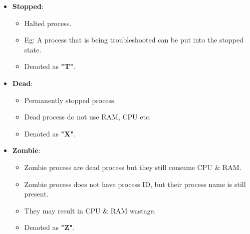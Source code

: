 \begin{flushleft}
\begin{itemize}
		\bigskip
		\item \textbf{Stopped}: 
		\begin{itemize}
			\item Halted process.
			\item Eg: A process that is being troubleshooted can be put into the stopped state.
			\item Denoted as \textbf{"T"}.
		\end{itemize}
		
		\bigskip
		\item \textbf{Dead}:
		\begin{itemize}
			\item Permanently stopped process.
			\item Dead process do not use RAM, CPU etc.
			\item Denoted as \textbf{"X"}.
		\end{itemize}
		
		
		\bigskip
		\item \textbf{Zombie}: 
		\begin{itemize}
			\item Zombie process are dead process but they still consume CPU \& RAM.
			\item Zombie process does not have process ID, but their process name is still present.
			\item They may result in CPU \& RAM wastage.
			\item Denoted as \textbf{"Z"}.
		\end{itemize}
		
	\end{itemize}


\end{flushleft}

\newpage


